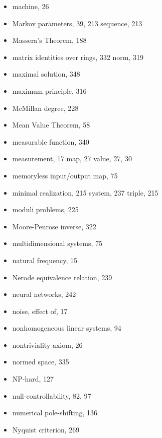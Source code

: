 \begin{itemize}
  \indexspace

  \item machine, 26
  \item Markov
    \subitem parameters, 39, 213
    \subitem sequence, 213
  \item Massera's Theorem, 188
  \item matrix
    \subitem identities over rings, 332
    \subitem norm, 319
  \item maximal solution, 348
  \item maximum principle, 316
  \item McMillan degree, 228
  \item Mean Value Theorem, 58
  \item measurable function, 340
  \item measurement, 17
    \subitem map, 27
    \subitem value, 27, 30
  \item memoryless input/output map, 75
  \item minimal
    \subitem realization, 215
    \subitem system, 237
    \subitem triple, 215
  \item moduli problems, 225
  \item Moore-Penrose inverse, 322
  \item multidimensional systems, 75

  \indexspace

  \item natural frequency, 15
  \item Nerode equivalence relation, 239
  \item neural networks, 242
  \item noise, effect of, 17
  \item nonhomogeneous linear systems, 94
  \item nontriviality axiom, 26
  \item normed space, 335
  \item NP-hard, 127
  \item null-controllability, 82, 97
  \item numerical pole-shifting, 136
  \item Nyquist criterion, 269

  \indexspace


\end{itemize}
